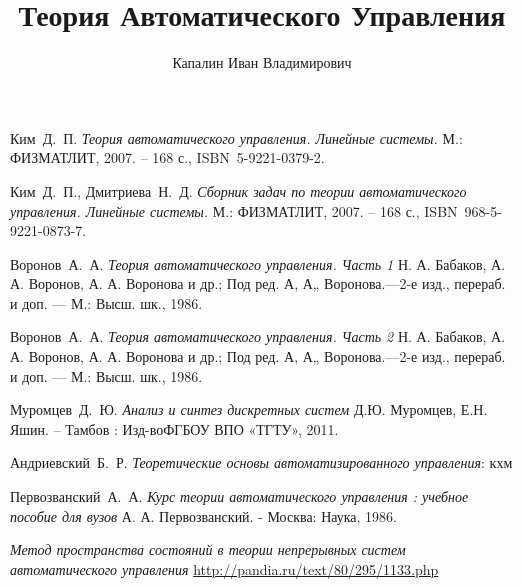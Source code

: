 \documentclass[openany,%
twoside,%
a5paper,%
9pt]{extbook}
\title{Теория Автоматического Управления}
\author{Капалин Иван Владимирович}
\date{}
\theoremstyle{plain}
\theoremstyle{definition}
\theoremstyle{remark}
\theoremstyle{plain}
\begin{document}
\maketitle

    \tableofcontents
\cleardoublepage








\begin{thebibliography}{0}
     Ким~Д.~П.
    \emph{Теория автоматического управления. Линейные системы.} М.: ФИЗМАТЛИТ, 2007. – 168 с., ISBN~5-9221-0379-2.

     Ким~Д.~П., Дмитриева~Н.~Д.
    \emph{Сборник задач по теории автоматического управления. Линейные системы.} М.: ФИЗМАТЛИТ, 2007. – 168 с., ISBN~968-5-9221-0873-7.

     Воронов~А.~А.
    \emph{Теория автоматического управления. Часть 1} Н. А. Бабаков, А. А. Воронов, А. А. Воронова и др.; Под ред. А, А„ Воронова.—2-е изд., перераб. и доп. — М.: Высш. шк., 1986.

     Воронов~А.~А.
    \emph{Теория автоматического управления. Часть 2} Н. А. Бабаков, А. А. Воронов, А. А. Воронова и др.; Под ред. А, А„ Воронова.—2-е изд., перераб. и доп. — М.: Высш. шк., 1986.

     Муромцев~Д.~Ю.
    \emph{Анализ и синтез дискретных систем} Д.Ю. Муромцев, Е.Н. Яшин. – Тамбов : Изд-воФГБОУ ВПО «ТГТУ», 2011.

     Андриевский~Б.~Р.
    \emph{Теоретические основы автоматизированного управления}: кхм

     Первозванский~А.~А.
    \emph{Курс теории автоматического управления : учебное пособие для вузов} А. А. Первозванский. - Москва: Наука, 1986.

    \emph{Метод пространства состояний в теории непрерывных систем автоматического управления} \url{http://pandia.ru/text/80/295/1133.php}

\end{thebibliography}
\end{document}
